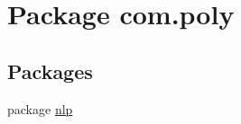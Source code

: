 \hypertarget{namespacecom_1_1poly}{\section{Package com.\-poly}
\label{namespacecom_1_1poly}
}
\subsection*{Packages}
\begin{DoxyCompactItemize}
\item 
package \hyperlink{namespacecom_1_1poly_1_1nlp}{nlp}
\end{DoxyCompactItemize}
